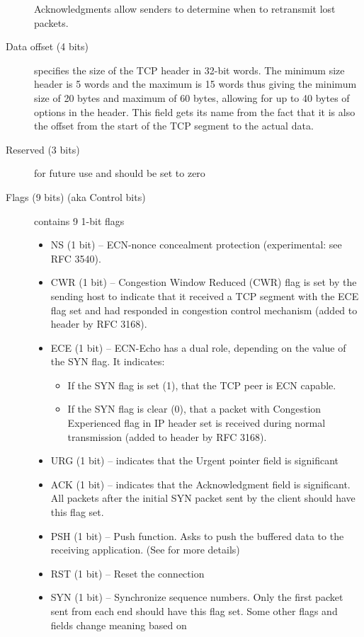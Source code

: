 \begin{description}
  Acknowledgments allow senders to determine when to retransmit lost packets.
\item[Data offset (4 bits)] specifies the size of the TCP header in 32-bit words. The
  minimum size header is 5 words and the maximum is 15 words thus giving the minimum size
  of 20 bytes and maximum of 60 bytes, allowing for up to 40 bytes of options in the
  header. This field gets its name from the fact that it is also the offset from the start
  of the TCP segment to the actual data.
\item[Reserved (3 bits)] for future use and should be set to zero
\item[Flags (9 bits) (aka Control bits)] contains 9 1-bit flags
  \begin{itemize}
  \item NS (1 bit) – ECN-nonce concealment protection (experimental: see RFC 3540).
  \item CWR (1 bit) – Congestion Window Reduced (CWR) flag is set by the sending host to
    indicate that it received a TCP segment with the ECE flag set and had responded in
    congestion control mechanism (added to header by RFC 3168).
  \item ECE (1 bit) – ECN-Echo has a dual role, depending on the value of the SYN flag. It
    indicates:
    \begin{itemize}
    \item If the SYN flag is set (1), that the TCP peer is ECN capable.
    \item If the SYN flag is clear (0), that a packet with Congestion Experienced flag in
      IP header set is received during normal transmission (added to header by RFC 3168).
    \end{itemize}
  \item URG (1 bit) – indicates that the Urgent pointer field is significant
  \item ACK (1 bit) – indicates that the Acknowledgment field is significant. All packets
    after the initial SYN packet sent by the client should have this flag set.
  \item PSH (1 bit) – Push function. Asks to push the buffered data to the receiving
    application. (See  for more details)
  \item RST (1 bit) – Reset the connection
  \item SYN (1 bit) – Synchronize sequence numbers. Only the first packet sent from each
    end should have this flag set. Some other flags and fields change meaning based on

\end{itemize}
\end{description}

